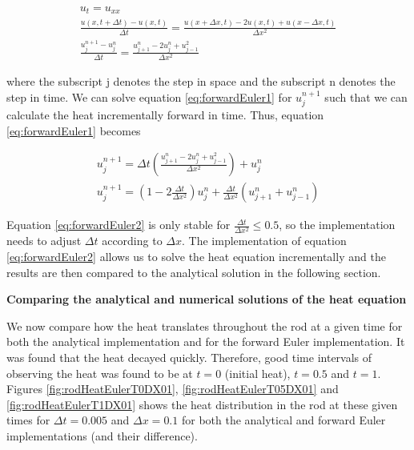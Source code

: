 \documentclass[12pt,a4paper]{article}
\begin{document}
\begin{equation}\label{eq:forwardEuler1}
\begin{aligned}
u_t = u_{xx}
\\
\frac{u(x,t+\Delta t) - u(x,t)}{\Delta t} = \frac{u(x+\Delta x, t)-2u(x,t)+u(x-\Delta x,t)}{\Delta x^2}
\\
\frac{u_j^{n+1}-u_j^n}{\Delta t} = \frac{u_{j+1}^n - 2u_j^n + u_{j-1}^2}{\Delta x^2}
\end{aligned}
\end{equation}

\noindent where the subscript j denotes the step in space and the subscript n denotes the step in time. We can solve equation \ref{eq:forwardEuler1} for $u_j^{n+1}$ such that we can calculate the heat incrementally forward in time. Thus, equation \ref{eq:forwardEuler1} becomes

\begin{equation}\label{eq:forwardEuler2}
\begin{aligned}
u_j^{n+1} = \Delta t(\frac{u_{j+1}^n - 2u_j^n + u_{j-1}^2}{\Delta x^2})+u_j^n
\\
u_j^{n+1} = (1-2\frac{\Delta t}{\Delta x^2})u_j^n + \frac{\Delta t}{\Delta x^2}(u_{j+1}^n + u_{j-1}^n)
\end{aligned}
\end{equation}

\noindent Equation \ref{eq:forwardEuler2} is only stable for $\frac{\Delta t}{\Delta x^2} \leq 0.5$, so the implementation needs to adjust $\Delta t$ according to $\Delta x$. The implementation of equation \ref{eq:forwardEuler2} allows us to solve the heat equation incrementally and the results are then compared to the analytical solution in the following section.

\begin{center}
\large{\textbf{Comparing the analytical and numerical solutions of the heat equation}}
\end{center}

\noindent We now compare how the heat translates throughout the rod at a given time for both the analytical implementation and for the forward Euler implementation. It was found that the heat decayed quickly. Therefore, good time intervals of observing the heat was found to be at $t = 0$ (initial heat), $t = 0.5$ and $t = 1$. Figures \ref{fig:rodHeatEulerT0DX01}, \ref{fig:rodHeatEulerT05DX01} and \ref{fig:rodHeatEulerT1DX01} shows the heat distribution in the rod at these given times for $\Delta t = 0.005$ and $\Delta x = 0.1$ for both the analytical and forward Euler implementations (and their difference).
\end{document}
